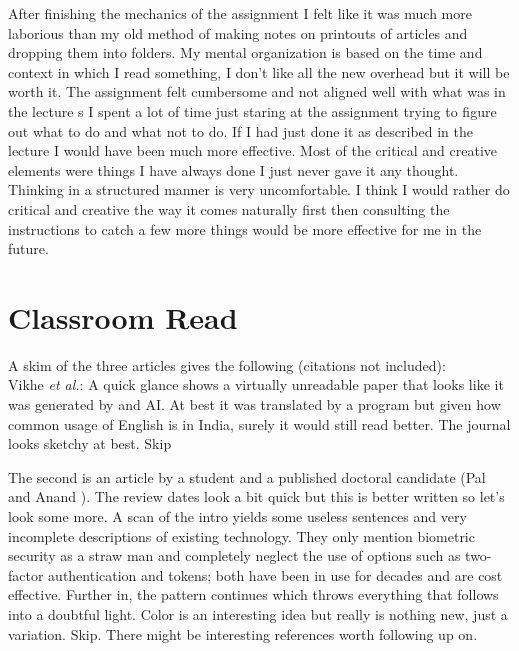 \documentclass{article}
\begin{document}
After finishing the mechanics of the assignment I felt like it was much more laborious than my old method of making notes on printouts of articles and dropping them into folders. My mental organization is based on the time and context in which I read something, I don't like all the new overhead but it will be worth it. The assignment felt cumbersome and not aligned well with what was in the lecture s I spent a lot of time just staring at the assignment trying to figure out what to do and what not to do. If I had just done it as described in the lecture I would have been much more effective. Most of the critical and creative elements were things I have always done I just never gave it any thought. Thinking in a structured manner is very uncomfortable. I think I would rather do critical and creative the way it comes naturally first then consulting the instructions to catch a few more things would be more effective for me in the future.
\section{Classroom Read}
A skim of the three articles gives the following (citations not included):\\
Vikhe \textit{et al.}: A quick glance shows a virtually unreadable paper \cite{vikhe_security_2015} that looks like it was generated by and AI. At best it was translated by a program but given how common usage of English is in India, surely it would still read better. The journal looks sketchy at best. Skip

The second is an article by a student and a published doctoral candidate (Pal and Anand \cite{pal_crypt_2018}). The review dates look a bit quick but this is better written so let's look some more. A scan of the intro yields some useless sentences and very incomplete descriptions of existing technology. They only mention biometric security as a straw man and completely neglect the use of options such as two-factor authentication and tokens; both have been in use for decades and are cost effective. Further in, the pattern continues which throws everything that follows into a doubtful light. Color is an interesting idea but really is nothing new, just a variation. Skip. There might be interesting references worth following up on.
\end{document}
